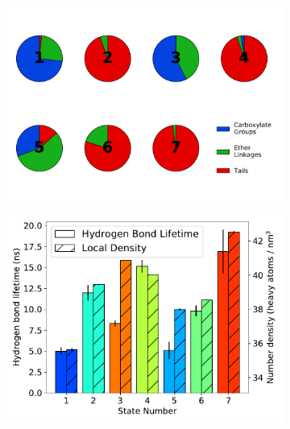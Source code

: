 \documentclass[journal=jpcbfk,manuscript=article]{achemso}
\begin{document}
  \begin{figure}
  \centering
  \begin{subfigure}{0.54\textwidth}
  \includegraphics[width=\textwidth]{hbond_pi_charts.pdf}
  \caption{}\label{fig:hbond_pi_charts}
  \end{subfigure}
  \begin{subfigure}{0.45\textwidth}
  \includegraphics[width=\textwidth]{hbond_lifetimes_density_MET.pdf}
  \caption{}\label{fig:hbond_lifetimes_density_MET}
  \end{subfigure}

\end{figure}
\end{document}

